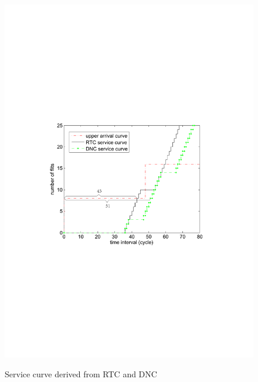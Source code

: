 \documentclass[10pt,journal]{IEEEtran}
\begin{document}
\begin{figure}
  \centering
  \includegraphics[scale=0.65]{figures/loose.pdf}\\
  \caption{Service curve derived from RTC and DNC}\label{loose}
\end{figure}
\end{document}
